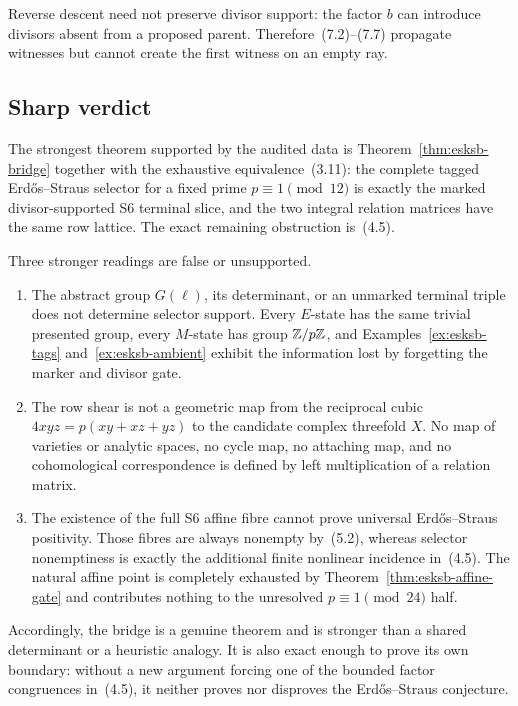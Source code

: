 Reverse descent need not preserve divisor support: the factor \(b\) can
introduce divisors absent from a proposed parent.  Therefore~(7.2)--(7.7)
propagate witnesses but cannot create the first witness on an empty ray.

\subsection{Sharp verdict}

The strongest theorem supported by the audited data is
Theorem~\ref{thm:esksb-bridge} together with the exhaustive equivalence~(3.11):
the complete tagged Erd\H{o}s--Straus selector for a fixed prime
\(p\equiv1\pmod {12}\) is exactly the marked divisor-supported S6 terminal
slice, and the two integral relation matrices have the same row lattice.
The exact remaining obstruction is~(4.5).

Three stronger readings are false or unsupported.

\begin{enumerate}
\item The abstract group \(G(\ell)\), its determinant, or an unmarked
terminal triple does not determine selector support.  Every \(E\)-state has
the same trivial presented group, every \(M\)-state has group \(\mathbb Z/p\mathbb Z\),
and Examples~\ref{ex:esksb-tags} and~\ref{ex:esksb-ambient} exhibit the information lost by forgetting
the marker and divisor gate.

\item The row shear is not a geometric map from the reciprocal cubic
\(4xyz=p(xy+xz+yz)\) to the candidate complex threefold \(X\).  No map of
varieties or analytic spaces, no cycle map, no attaching map, and no
cohomological correspondence is defined by left multiplication of a
relation matrix.

\item The existence of the full S6 affine fibre cannot prove universal
Erd\H{o}s--Straus positivity.  Those fibres are always nonempty by~(5.2),
whereas selector nonemptiness is exactly the additional finite nonlinear
incidence in~(4.5).  The natural affine point is completely exhausted by
Theorem~\ref{thm:esksb-affine-gate} and contributes nothing to the unresolved
\(p\equiv1\pmod {24}\) half.
\end{enumerate}

Accordingly, the bridge is a genuine theorem and is stronger than a shared
determinant or a heuristic analogy.  It is also exact enough to prove its own
boundary: without a new argument forcing one of the bounded factor
congruences in~(4.5), it neither proves nor disproves the Erd\H{o}s--Straus
conjecture.
